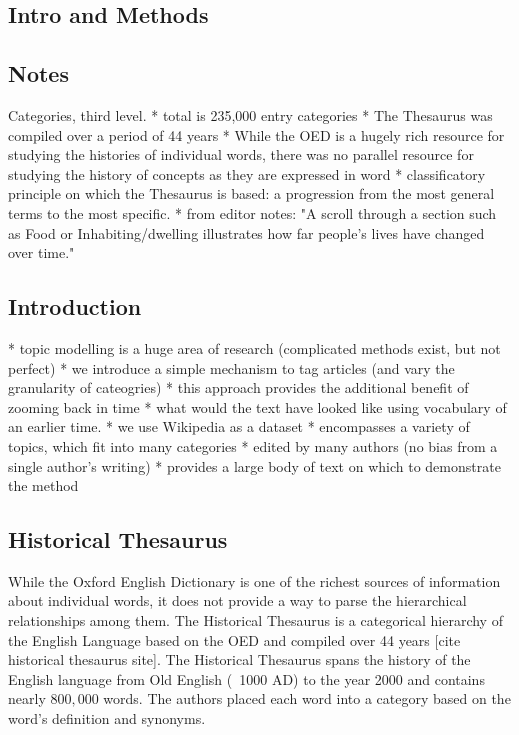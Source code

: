 \documentclass[a4paper, 12pt]{article}
\title{}
\date{}
\begin{document}
\begin{center}
\section*{Intro and Methods}
\end{center}


\subsection*{Notes}

Categories, third level.
    * total is 235,000 entry categories
* The Thesaurus was compiled over a period of 44 years
* While the OED is a hugely rich resource for studying the histories of individual words, there was no parallel resource for studying the history of concepts as they are expressed in word
* classificatory principle on which the Thesaurus is based: a progression from the most general terms to the most specific.
* from editor notes: "A scroll through a section such as Food or Inhabiting/dwelling illustrates how far people’s lives have changed over time."


\subsection*{Introduction}

* topic modelling is a huge area of research (complicated methods exist, but not perfect)
* we introduce a simple mechanism to tag articles (and vary the granularity of cateogries) 
    * this approach provides the additional benefit of zooming back in time
        * what would the text have looked like using vocabulary of an earlier time.
* we use Wikipedia as a dataset 
    * encompasses a variety of topics, which fit into many categories
    * edited by many authors (no bias from a single author's writing)
    * provides a large body of text on which to demonstrate the method


\subsection*{Historical Thesaurus}

While the Oxford English Dictionary is one of the richest sources of information about individual words, it does not provide a way to parse the hierarchical relationships among them.
The Historical Thesaurus is a categorical hierarchy of the English Language based on the OED and compiled over 44 years
[cite historical thesaurus site]. 
The Historical Thesaurus spans the history of the English language from Old English (~1000 AD) to
the year 2000 and contains nearly $800,000$ words.
The authors placed each word into a category based on the word's definition and synonyms.
\end{document}
